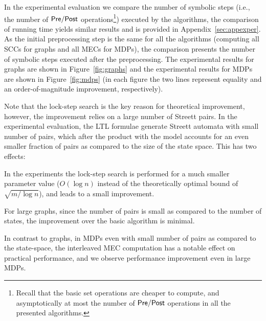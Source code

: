 \smallskip{}
In the experimental evaluation we compare the number of symbolic steps 
(i.e., the number of $\mathsf{Pre}/\mathsf{Post}$ operations\footnote{Recall that the basic
set operations are cheaper to compute, and asymptotically at most the
number of $\mathsf{Pre}/\mathsf{Post}$ operations in all the presented algorithms.})
executed by the algorithms, the comparison of running time yields similar
results and is provided in Appendix~\ref{sec:appexper}.
As the initial preprocessing step is the same for all the algorithms
(computing all SCCs for graphs and all MECs for MDPs), the comparison
presents the number of symbolic steps executed after the preprocessing.
The experimental results for graphs are shown in Figure~\ref{fig:graphs} and
the experimental results for MDPs are shown in Figure~\ref{fig:mdps} (in each
figure the two lines represent equality and an order-of-magnitude improvement, respectively).

\smallskip{}
Note that the lock-step search is the key reason for theoretical 
improvement, however, the improvement relies on a large number of Streett 
pairs. In the experimental evaluation, the LTL formulae generate
Streett automata with small number of pairs, which after the product
with the model accounts for an even smaller fraction of pairs as compared to
the size of the state space. This has two effects:
\begin{compactitem}
\item In the experiments the lock-step search is performed for a much smaller 
parameter value ($O(\log n)$ instead of the theoretically optimal  bound of 
$\sqrt{m/\log n}$), and leads to a small improvement.
\item For large graphs, since the number of pairs is small as compared to the 
number of states, the improvement over the basic algorithm is minimal.
\end{compactitem}
In contrast to graphs, in MDPs even with small number of pairs as 
compared to the state-space, the interleaved MEC computation has
a notable effect on practical performance, and we observe performance improvement 
even in large MDPs.
